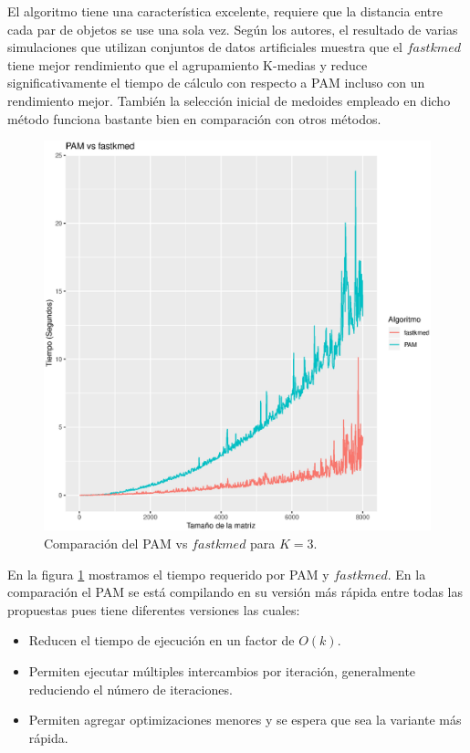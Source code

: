 \documentclass[12pt]{report} %
\theoremstyle{definition}
\begin{document}
{El algoritmo tiene una característica excelente, requiere que la distancia entre cada par de objetos se use una sola vez. Según los autores, el resultado de varias simulaciones que utilizan conjuntos de datos artificiales muestra que el $fastkmed$ tiene mejor rendimiento que el agrupamiento K-medias y reduce significativamente el tiempo de cálculo con respecto a PAM incluso con un rendimiento mejor. También la selección inicial de medoides empleado en dicho método funciona bastante bien en comparación con otros métodos.\cite{kmedarticle}

\begin{figure}[H]
	\centering
	\includegraphics[scale=0.6]{imagenes/pam_vs_fastmed.eps}
	\caption{Comparación del PAM vs $fastkmed$ para $K=3$.}
	\label{fig:comparacion}
\end{figure}

En la figura \ref{fig:comparacion} mostramos el tiempo requerido por PAM y $fastkmed$. En la comparación el PAM se está compilando en su versión más rápida entre todas las propuestas \cite{pam} pues tiene diferentes versiones las cuales:
\begin{itemize}
	\item Reducen el tiempo de ejecución en un factor de $O(k)$.
	\item Permiten ejecutar múltiples intercambios por iteración, generalmente reduciendo el número de iteraciones.
	\item Permiten agregar optimizaciones menores y se espera que sea la variante más rápida.
\end{itemize}

}
\end{document}
